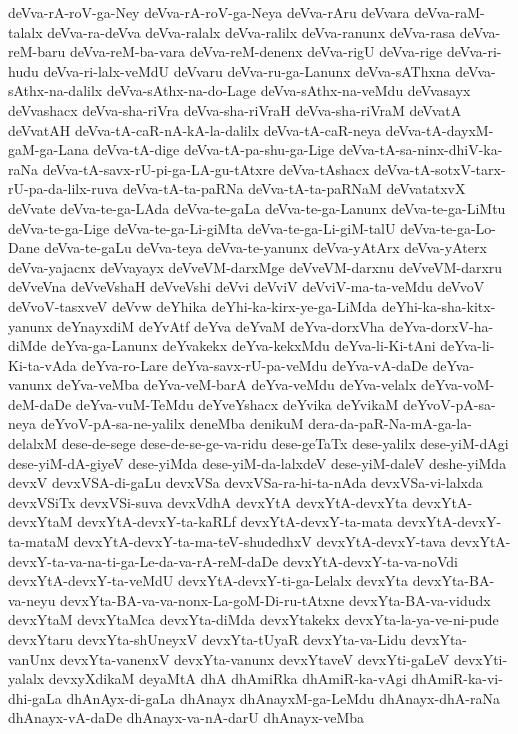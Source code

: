 {deVva-rA-roV-ga-Ney
deVva-rA-roV-ga-Neya
deVva-rAru
deVvara
deVva-raM-talalx
deVva-ra-deVva
deVva-ralalx
deVva-ralilx
deVva-ranunx
deVva-rasa
deVva-reM-baru
deVva-reM-ba-vara
deVva-reM-denenx
deVva-rigU
deVva-rige
deVva-ri-hudu
deVva-ri-lalx-veMdU
deVvaru
deVva-ru-ga-Lanunx
deVva-sAThxna
deVva-sAthx-na-dalilx
deVva-sAthx-na-do-Lage
deVva-sAthx-na-veMdu
deVvasayx
deVvashacx
deVva-sha-riVra
deVva-sha-riVraH
deVva-sha-riVraM
deVvatA
deVvatAH
deVva-tA-caR-nA-kA-la-dalilx
deVva-tA-caR-neya
deVva-tA-dayxM-gaM-ga-Lana
deVva-tA-dige
deVva-tA-pa-shu-ga-Lige
deVva-tA-sa-ninx-dhiV-ka-raNa
deVva-tA-savx-rU-pi-ga-LA-gu-tAtxre
deVva-tAshacx
deVva-tA-sotxV-tarx-rU-pa-da-lilx-ruva
deVva-tA-ta-paRNa
deVva-tA-ta-paRNaM
deVvatatxvX
deVvate
deVva-te-ga-LAda
deVva-te-gaLa
deVva-te-ga-Lanunx
deVva-te-ga-LiMtu
deVva-te-ga-Lige
deVva-te-ga-Li-giMta
deVva-te-ga-Li-giM-talU
deVva-te-ga-Lo-Dane
deVva-te-gaLu
deVva-teya
deVva-te-yanunx
deVva-yAtArx
deVva-yAterx
deVva-yajacnx
deVvayayx
deVveVM-darxMge
deVveVM-darxnu
deVveVM-darxru
deVveVna
deVveVshaH
deVveVshi
deVvi
deVviV
deVviV-ma-ta-veMdu
deVvoV
deVvoV-tasxveV
deVvw
deYhika
deYhi-ka-kirx-ye-ga-LiMda
deYhi-ka-sha-kitx-yanunx
deYnayxdiM
deYvAtf
deYva
deYvaM
deYva-dorxVha
deYva-dorxV-ha-diMde
deYva-ga-Lanunx
deYvakekx
deYva-kekxMdu
deYva-li-Ki-tAni
deYva-li-Ki-ta-vAda
deYva-ro-Lare
deYva-savx-rU-pa-veMdu
deYva-vA-daDe
deYva-vanunx
deYva-veMba
deYva-veM-barA
deYva-veMdu
deYva-velalx
deYva-voM-deM-daDe
deYva-vuM-TeMdu
deYveYshacx
deYvika
deYvikaM
deYvoV-pA-sa-neya
deYvoV-pA-sa-ne-yalilx
deneMba
denikuM
dera-da-paR-Na-mA-ga-la-delalxM
dese-de-sege
dese-de-se-ge-va-ridu
dese-geTaTx
dese-yalilx
dese-yiM-dAgi
dese-yiM-dA-giyeV
dese-yiMda
dese-yiM-da-lalxdeV
dese-yiM-daleV
deshe-yiMda
devxV
devxVSA-di-gaLu
devxVSa
devxVSa-ra-hi-ta-nAda
devxVSa-vi-lalxda
devxVSiTx
devxVSi-suva
devxVdhA
devxYtA
devxYtA-devxYta
devxYtA-devxYtaM
devxYtA-devxY-ta-kaRLf
devxYtA-devxY-ta-mata
devxYtA-devxY-ta-mataM
devxYtA-devxY-ta-ma-teV-shudedhxV
devxYtA-devxY-tava
devxYtA-devxY-ta-va-na-ti-ga-Le-da-va-rA-reM-daDe
devxYtA-devxY-ta-va-noVdi
devxYtA-devxY-ta-veMdU
devxYtA-devxY-ti-ga-Lelalx
devxYta
devxYta-BA-va-neyu
devxYta-BA-va-va-nonx-La-goM-Di-ru-tAtxne
devxYta-BA-va-vidudx
devxYtaM
devxYtaMca
devxYta-diMda
devxYtakekx
devxYta-la-ya-ve-ni-pude
devxYtaru
devxYta-shUneyxV
devxYta-tUyaR
devxYta-va-Lidu
devxYta-vanUnx
devxYta-vanenxV
devxYta-vanunx
devxYtaveV
devxYti-gaLeV
devxYti-yalalx
devxyXdikaM
deyaMtA
dhA
dhAmiRka
dhAmiR-ka-vAgi
dhAmiR-ka-vi-dhi-gaLa
dhAnAyx-di-gaLa
dhAnayx
dhAnayxM-ga-LeMdu
dhAnayx-dhA-raNa
dhAnayx-vA-daDe
dhAnayx-va-nA-darU
dhAnayx-veMba
}
